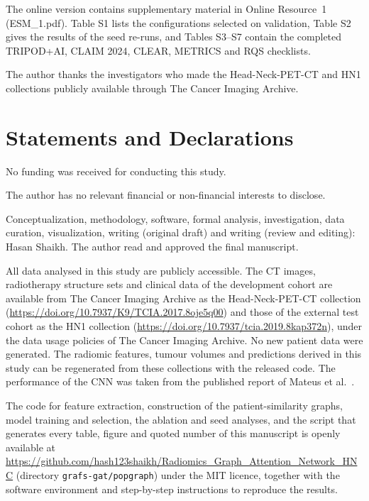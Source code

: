 \documentclass[pdflatex,iicol,sn-nature]{sn-jnl}
\begin{document}
The online version contains supplementary material in Online Resource~1 (ESM\_1.pdf). Table S1 lists the configurations selected on validation, Table S2 gives the results of the seed re-runs, and Tables S3--S7 contain the completed TRIPOD+AI, CLAIM 2024, CLEAR, METRICS and RQS checklists.

The author thanks the investigators who made the Head-Neck-PET-CT and HN1 collections publicly available through The Cancer Imaging Archive.

\section*{Statements and Declarations}

No funding was received for conducting this study.

The author has no relevant financial or non-financial interests to disclose.

Conceptualization, methodology, software, formal analysis, investigation, data curation, visualization, writing (original draft) and writing (review and editing): Hasan Shaikh. The author read and approved the final manuscript.

All data analysed in this study are publicly accessible. The CT images, radiotherapy structure sets and clinical data of the development cohort are available from The Cancer Imaging Archive as the Head-Neck-PET-CT collection (\url{https://doi.org/10.7937/K9/TCIA.2017.8oje5q00}) and those of the external test cohort as the HN1 collection (\url{https://doi.org/10.7937/tcia.2019.8kap372n}), under the data usage policies of The Cancer Imaging Archive. No new patient data were generated. The radiomic features, tumour volumes and predictions derived in this study can be regenerated from these collections with the released code. The performance of the CNN was taken from the published report of Mateus et al.~\cite{mateus2023}.

The code for feature extraction, construction of the patient-similarity graphs, model training and selection, the ablation and seed analyses, and the script that generates every table, figure and quoted number of this manuscript is openly available at \url{https://github.com/hash123shaikh/Radiomics_Graph_Attention_Network_HNC} (directory \texttt{grafs-gat/popgraph}) under the MIT licence, together with the software environment and step-by-step instructions to reproduce the results.
\end{document}
